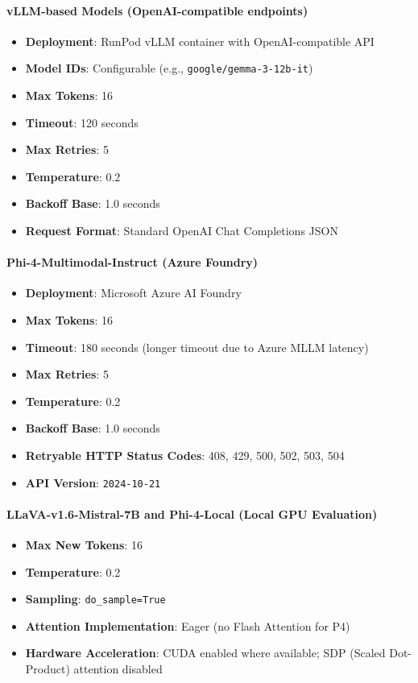 \paragraph{vLLM-based Models (OpenAI-compatible endpoints)}
\begin{itemize}
    \item \textbf{Deployment}: RunPod vLLM container with OpenAI-compatible API
    \item \textbf{Model IDs}: Configurable (e.g., \texttt{google/gemma-3-12b-it})
    \item \textbf{Max Tokens}: 16
    \item \textbf{Timeout}: 120 seconds
    \item \textbf{Max Retries}: 5
    \item \textbf{Temperature}: 0.2
    \item \textbf{Backoff Base}: 1.0 seconds
    \item \textbf{Request Format}: Standard OpenAI Chat Completions JSON
\end{itemize}

\paragraph{Phi-4-Multimodal-Instruct (Azure Foundry)}
\begin{itemize}
    \item \textbf{Deployment}: Microsoft Azure AI Foundry
    \item \textbf{Max Tokens}: 16
    \item \textbf{Timeout}: 180 seconds (longer timeout due to Azure MLLM latency)
    \item \textbf{Max Retries}: 5
    \item \textbf{Temperature}: 0.2
    \item \textbf{Backoff Base}: 1.0 seconds
    \item \textbf{Retryable HTTP Status Codes}: 408, 429, 500, 502, 503, 504
    \item \textbf{API Version}: \texttt{2024-10-21}
\end{itemize}

\paragraph{LLaVA-v1.6-Mistral-7B and Phi-4-Local (Local GPU Evaluation)}
\begin{itemize}
    \item \textbf{Max New Tokens}: 16
    \item \textbf{Temperature}: 0.2
    \item \textbf{Sampling}: \texttt{do\_sample=True}
    \item \textbf{Attention Implementation}: Eager (no Flash Attention for P4)
    \item \textbf{Hardware Acceleration}: CUDA enabled where available; SDP (Scaled Dot-Product) attention disabled
\end{itemize}

